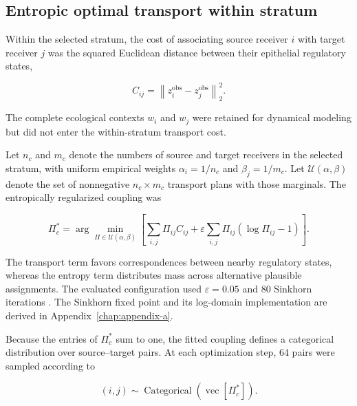 \subsection{Entropic optimal transport within stratum}
\label{sec:methods-entropic-ot}

Within the selected stratum, the cost of associating source receiver \(i\) with
target receiver \(j\) was the squared Euclidean distance between their
epithelial regulatory states,

\begin{equation}
C_{ij}
=
\left\|
z_i^{\mathrm{obs}}
-
z_j^{\mathrm{obs}}
\right\|_2^2.
\label{eq:methods-ot-cost}
\end{equation}

The complete ecological contexts \(w_i\) and \(w_j\) were retained for
dynamical modeling but did not enter the within-stratum transport cost.

Let \(n_c\) and \(m_c\) denote the numbers of source and target receivers in
the selected stratum, with uniform empirical weights
\(\alpha_i=1/n_c\) and \(\beta_j=1/m_c\). Let
\(\mathcal{U}(\alpha,\beta)\) denote the set of nonnegative
\(n_c\times m_c\) transport plans with those marginals. The entropically
regularized coupling was

\begin{equation}
\Pi_c^{\ast}
=
\arg\min_{\Pi\in\mathcal{U}(\alpha,\beta)}
\left[
\sum_{i,j}
\Pi_{ij}C_{ij}
+
\varepsilon
\sum_{i,j}
\Pi_{ij}
\left(
\log\Pi_{ij}-1
\right)
\right].
\label{eq:methods-entropic-coupling}
\end{equation}

The transport term favors correspondences between nearby regulatory states,
whereas the entropy term distributes mass across alternative plausible
assignments. The evaluated configuration used \(\varepsilon=0.05\) and
\(80\) Sinkhorn iterations \autocite{Cuturi2013-li}. The Sinkhorn fixed point
and its log-domain implementation are derived in
Appendix~\ref{chap:appendix-a}.

Because the entries of \(\Pi_c^\ast\) sum to one, the fitted coupling defines a
categorical distribution over source--target pairs. At each optimization step,
\(64\) pairs were sampled according to

\begin{equation}
(i,j)
\sim
\operatorname{Categorical}
\left(
\operatorname{vec}
\left[
\Pi_c^{\ast}
\right]
\right).
\label{eq:methods-coupling-pair-sampling}
\end{equation}

